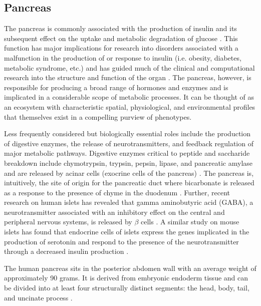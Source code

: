 \subsection{Pancreas}
The pancreas is commonly associated with the production of insulin and its subsequent effect on the uptake and metabolic degradation of glucose \cite{caicedo_paracrine_2013}. This function has major implications for research into disorders associated with a malfunction in the production of or response to insulin (i.e. obesity, diabetes, metabolic syndrome, etc.) and has guided much of the clinical and computational research into the structure and function of the organ \cite{woods_pancreatic_2006}. The pancreas, however, is responsible for producing a broad range of hormones and enzymes and is implicated in a considerable scope of metabolic processes. It can be thought of as an ecosystem with characteristic spatial, physiological, and environmental profiles that themselves exist in a compelling purview of phenotypes. 
\par Less frequently considered but biologically essential roles include the production of digestive enzymes, the release of neurotransmitters, and feedback regulation of major metabolic pathways. Digestive enzymes critical to peptide and saccharide breakdown include chymotrypsin, trypsin, pepsin, lipase, and pancreatic amylase and are released by acinar cells (exocrine cells of the pancreas) \cite{ianiro_digestive_2016}. The pancreas is, intuitively, the site of origin for the pancreatic duct where bicarbonate is released as a response to the presence of chyme in the duodenum \cite{hegyi_pancreatic_2011}. Further, recent research on human islets has revealed that gamma aminobutyric acid (GABA), a neurotransmitter associated with an inhibitory effect on the central and peripheral nervous systems, is released by $\beta$ cells \cite{rutter_gaba_2017}. A similar study on mouse islets has found that endocrine cells of islets express the genes implicated in the production of serotonin and respond to the presence of the neurotransmitter through a decreased insulin production \cite{chandra_neural_2009}.
\par The human pancreas sits in the posterior abdomen wall with an average weight of approximately 90 grams. It is derived from embryonic endoderm tissue and can be divided into at least four structurally distinct segments: the head, body, tail, and uncinate process \cite{g_quantification_2012} \cite{birnbaum_head_2019}.

